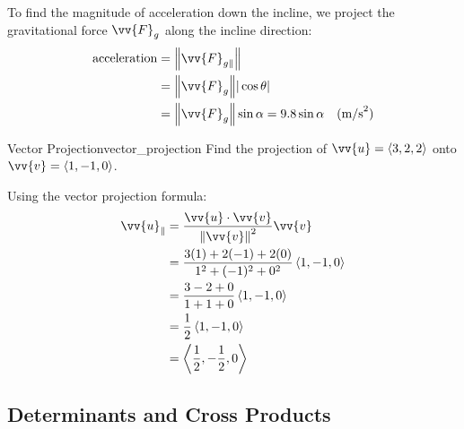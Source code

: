 \begin{sol}
To find the magnitude of acceleration down the incline, we project the gravitational force $\vv{F}_g$ along the incline direction:
\begin{align*}
\text{acceleration} &= \norm{\vv{F}_{g\parallel}} \\
                    &= \norm{\vv{F}_g} |\cos \theta| \\
                    &= \norm{\vv{F}_g} \sin \alpha = 9.8 \sin \alpha \quad \text{(m/s}^2\text{)}
\end{align*}
\end{sol}
\begin{problem}{Vector Projection}{vector_projection}
Find the projection of $\vv{u} = \ang{3, 2, 2}$ onto $\vv{v} = \ang{1, -1, 0}$.
\end{problem}

\begin{sol}
Using the vector projection formula:
\begin{align*}
\vv{u}_{\parallel} &= \frac{\vv{u} \cdot \vv{v}}{\norm{\vv{v}}^2} \vv{v} \\
                   &= \frac{3(1) + 2(-1) + 2(0)}{1^2 + (-1)^2 + 0^2} \ang{1, -1, 0} \\
                   &= \frac{3 - 2 + 0}{1 + 1 + 0} \ang{1, -1, 0} \\
                   &= \frac{1}{2} \ang{1, -1, 0} \\
                   &= \ang{\frac{1}{2}, -\frac{1}{2}, 0}
\end{align*}
\end{sol}

\subsection{Determinants and Cross Products}

